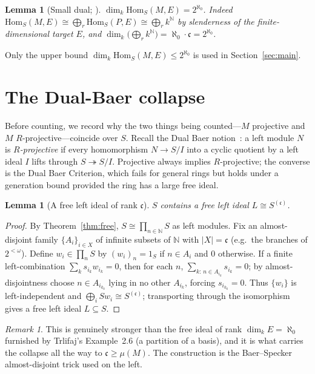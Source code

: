\documentclass[11pt,reqno]{amsart}
\theoremstyle{plain}
\newtheorem{lemma}[theorem]{Lemma}
\theoremstyle{definition}
\theoremstyle{remark}
\newtheorem{remark}[theorem]{Remark}
\newcommand{\Hom}{\mathrm{Hom}}
\newcommand{\N}{\mathbb{N}}
\begin{document}
\begin{lemma}[Small dual; {\cite[Thm.~F(a)]{macbeth-reduction}}]\label{lem:F2}
$\dim_k\Hom_S(M,E)=2^{\aleph_0}$. Indeed $\Hom_S(M,E)\cong\bigoplus_r\Hom_S(P,E)\cong\bigoplus_r k^{\N}$ by slenderness of the finite-dimensional target $E$, and $\dim_k\bigl(\bigoplus_r k^{\N}\bigr)=\aleph_0\cdot\mathfrak c=2^{\aleph_0}$.
\end{lemma}

Only the upper bound $\dim_k\Hom_S(M,E)\le 2^{\aleph_0}$ is used in Section~\ref{sec:main}.

\section{The Dual-Baer collapse}\label{sec:reduction}

Before counting, we record why the two things being counted---$M$ projective and $M$ $R$-projective---coincide over $S$. Recall the Dual Baer notion~\cite{trlifaj-dbc}: a left module $N$ is \emph{$R$-projective} if every homomorphism $N\to S/I$ into a cyclic quotient by a left ideal $I$ lifts through $S\twoheadrightarrow S/I$. Projective always implies $R$-projective; the converse is the Dual Baer Criterion, which fails for general rings but holds under a generation bound provided the ring has a large free ideal.

\begin{lemma}[A free left ideal of rank $\mathfrak c$]\label{lem:free-ideal}
$S$ contains a free left ideal $L\cong S^{(\mathfrak c)}$.
\end{lemma}

\begin{proof}
By Theorem~\ref{thm:free}, $S\cong\prod_{n\in\N}S$ as left modules. Fix an almost-disjoint family $\{A_i\}_{i\in X}$ of infinite subsets of $\N$ with $|X|=\mathfrak c$ (e.g.\ the branches of $2^{<\omega}$). Define $w_i\in\prod_n S$ by $(w_i)_n=1_S$ if $n\in A_i$ and $0$ otherwise. If a finite left-combination $\sum_k s_{i_k}w_{i_k}=0$, then for each $n$, $\sum_{k:\,n\in A_{i_k}}s_{i_k}=0$; by almost-disjointness choose $n\in A_{i_{k_0}}$ lying in no other $A_{i_k}$, forcing $s_{i_{k_0}}=0$. Thus $\{w_i\}$ is left-independent and $\bigoplus_i Sw_i\cong S^{(\mathfrak c)}$; transporting through the isomorphism gives a free left ideal $L\subseteq S$.
\end{proof}

\begin{remark}
This is genuinely stronger than the free ideal of rank $\dim_k E=\aleph_0$ furnished by Trlifaj's Example~2.6 (a partition of a basis), and it is what carries the collapse all the way to $\mathfrak c\ge\mu(M)$. The construction is the Baer--Specker almost-disjoint trick used on the left.
\end{remark}
\end{document}

